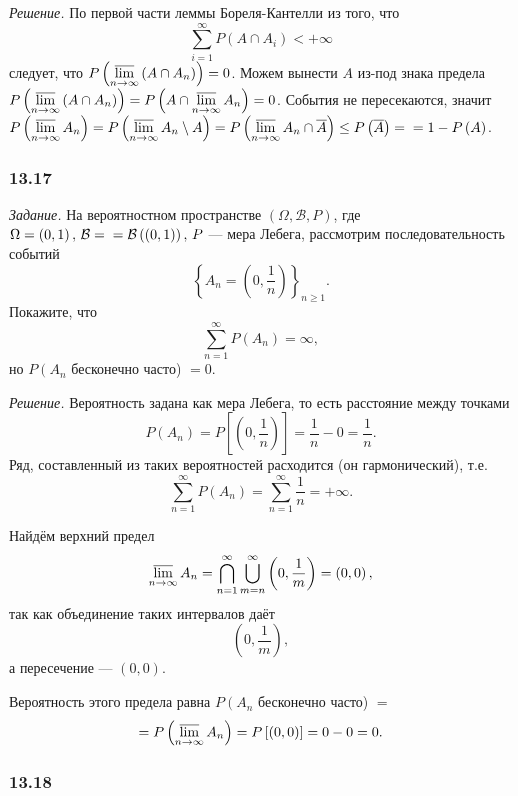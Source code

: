 \textit{Решение.} По первой части леммы Бореля-Кантелли из того, что
$$ \sum \limits_{i=1}^{ \infty } P \left( A \cap A_i \right) < + \infty $$
следует, что $P \left( \varlimsup \limits_{n \to \infty } \left( A \cap A_n \right) \right) = 0$.
Можем вынести $A$ из-под знака предела
$P \left( \varlimsup \limits_{n \to \infty } \left( A \cap A_n \right) \right) =
P \left( A \cap \varlimsup \limits_{n \to \infty } A_n \right) =
0$.
События не пересекаются,
значит
$P \left( \varlimsup \limits_{n \to \infty } A_n \right) =
P \left( \varlimsup \limits_{n \to \infty } A_n \setminus A \right) =
P \left( \varlimsup \limits_{n \to \infty } A_n \cap \overline{A} \right) \leq
P \left( \overline{A} \right) = \\
= 1 - P \left( A \right) $.

\subsubsection*{13.17}

\textit{Задание.}
На вероятностном пространстве
$ \left( \Omega, \mathcal{B}, P \right) $, где $ \Omega = \left( 0, 1 \right), \, \mathcal{B} = \\
= \mathcal{B} \left( \left( 0, 1 \right) \right), \, P$ ---
мера Лебега, рассмотрим последовательность событий
$$ \left\{ A_n = \left( 0, \frac{1}{n} \right) \right\}_{n \geq 1}.$$
Покажите, что
$$ \sum \limits_{n=1}^{ \infty } P \left( A_n \right) =
\infty,$$
но $P \left( A_n \right.$ бесконечно часто) $= 0$.

\textit{Решение.}
Вероятность задана как мера Лебега,
то есть расстояние между точками
$$P \left( A_n \right) =
P \left[ \left( 0, \frac{1}{n} \right) \right] =
\frac{1}{n} - 0 =
\frac{1}{n}.$$
Ряд, составленный из таких вероятностей расходится (он гармонический), т.е.
$$ \sum \limits_{n=1}^{ \infty} P \left( A_n \right) =
\sum \limits_{n=1}^{ \infty } \frac{1}{n} =
+ \infty.$$

Найдём верхний предел
$$ \varlimsup \limits_{n \to \infty } A_n =
\bigcap \limits_{n=1}^{ \infty } \bigcup \limits_{m=n}^{ \infty } \left( 0, \frac{1}{m} \right) =
\left( 0, 0 \right),$$
так как объединение таких интервалов даёт
$$ \left( 0, \frac{1}{m} \right),$$
а пересечение --- $ \left( 0, 0 \right) $.

Вероятность этого предела равна
$P \left( A_n \right.$ бесконечно часто) $=$
$$= P \left( \varlimsup \limits_{n \to \infty } A_n \right) =
P \left[ \left( 0, 0 \right) \right] =
0 - 0 =
0.$$

\subsubsection*{13.18}


